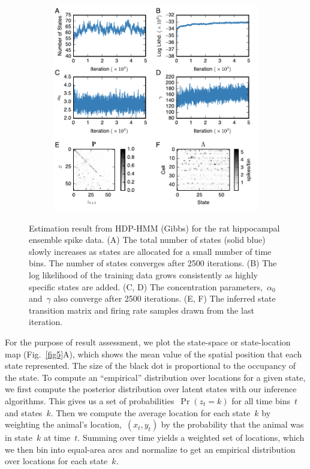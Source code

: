 \begin{figure}
  \centering
  \begin{subfigure}[t]{5.0in}
    \includegraphics[width=\textwidth]{figures/ch5/Fig6.pdf}
  \end{subfigure}
  \caption[Inferred parameters of the HDP-HMM for hippocampal
    data]{Estimation result from HDP-HMM (Gibbs) for the rat
    hippocampal ensemble spike data. (A) The total number of states
    (solid blue) slowly increases as states are allocated for a small
    number of time bins. The number of states converges after 2500
    iterations. (B) The log likelihood of the training data grows
    consistently as highly specific states are added. (C, D) The
    concentration parameters,~$\alpha_0$ and~$\gamma$ also converge
    after 2500 iterations. (E, F) The inferred state transition matrix
    and firing rate samples drawn from the last iteration.  }
  \label{fig6}
\end{figure}

For the purpose of result assessment, we plot the state-space or
state-location map (Fig.~\ref{fig5}A), which shows the mean value of
the spatial position that each state represented. The size of the
black dot is proportional to the occupancy of the state.  To compute
an ``empirical'' distribution over locations for a given state, we
first compute the posterior distribution over latent states with our
inference algorithms. This gives us a set of
probabilities~$\Pr(z_t=k)$ for all time bins~$t$ and states~$k$. Then
we compute the average location for each state~$k$ by weighting the
animal's location,~$(x_t,y_t)$ by the probability that the animal was
in state~$k$ at time~$t$. Summing over time yields a weighted set of
locations, which we then bin into equal-area arcs and normalize to get
an empirical distribution over locations for each state~$k$.

